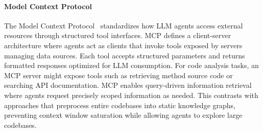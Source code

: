 \paragraph{Model Context Protocol}
The Model Context Protocol~\cite{mcp} standardizes how LLM agents access external resources through structured tool interfaces. MCP defines a client-server architecture where agents act as clients that invoke tools exposed by servers managing data sources. Each tool accepts structured parameters and returns formatted responses optimized for LLM consumption. For code analysis tasks, an MCP server might expose tools such as retrieving method source code or searching API documentation. MCP enables query-driven information retrieval where agents request precisely scoped information as needed. This contrasts with approaches that preprocess entire codebases into static knowledge graphs, preventing context window saturation while allowing agents to explore large codebases.
